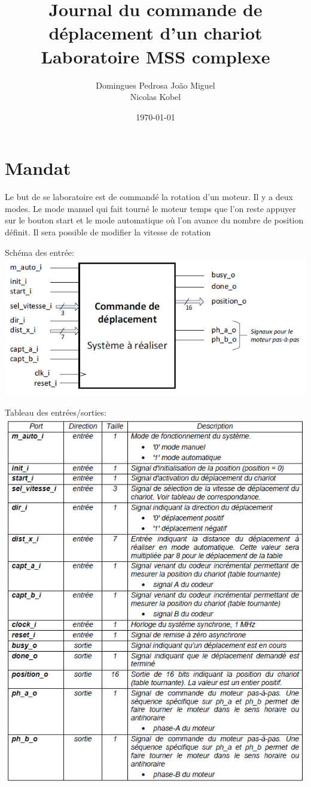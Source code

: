 \documentclass[10pt,a4paper]{article}
\author{Domingues Pedrosa João Miguel \\ Nicolas Kobel}
\title{Journal du commande de déplacement d'un chariot 
\\Laboratoire MSS complexe}
\date{\today}
\begin{document}
\maketitle
\newpage
\tableofcontents
\newpage

\section{Mandat}
Le but de se laboratoire est de commandé la rotation d'un moteur. Il y a deux modes. Le mode manuel qui fait tourné le moteur temps que l'on reste appuyer sur le bouton start et le mode automatique où l'on avance du nombre de position définit. Il sera possible de modifier la vitesse de rotation

Schéma des entrée:\\
\includegraphics[scale=0.5]{images/schema_entree.jpg}

Tableau des entrées/sorties:\\
\includegraphics[scale=0.5]{images/tableau.jpg}
\end{document}
